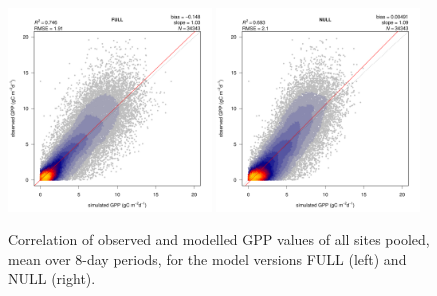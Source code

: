 \documentclass{myreport}
\begin{document}
\begin{figure}[!ht]
    \includegraphics[width=0.48\textwidth]{fig/modobs_xdaily_FULL.pdf}
    \includegraphics[width=0.48\textwidth]{fig/modobs_xdaily_NULL.pdf}
    \caption{Correlation of observed and modelled GPP values of all sites pooled, mean over 8-day periods, for the model versions FULL (left) and NULL (right).}
    \label{fig:modobs_xdaily}
\end{figure}
\end{document}

